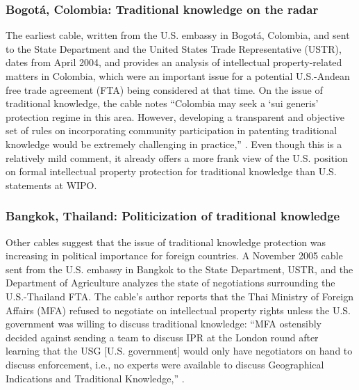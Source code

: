 \documentclass[12pt]{article}
\begin{document}
\subsubsection{Bogot\'a, Colombia: Traditional knowledge on the radar}
The earliest 
cable, written from the U.S. embassy in Bogot\'a, Colombia, and sent to the State Department and the 
United States Trade Representative (USTR), dates from April 2004, and provides an analysis of intellectual 
property-related matters in Colombia, which were an important issue for a potential U.S.-Andean 
free trade agreement (FTA) being considered at that time. 
On the issue of traditional knowledge, the cable 
notes ``Colombia may seek a `sui generis' protection regime in this area. However, developing a 
transparent and objective set of rules on incorporating community participation in patenting 
traditional knowledge would be extremely challenging in 
practice,'' \citep{u.s._department_of_state2004andean}. Even though this 
is a relatively mild comment, it already offers a more frank view of the U.S. position on formal 
intellectual property protection for traditional knowledge than U.S. statements at WIPO.

\subsubsection{Bangkok, Thailand: Politicization of traditional knowledge}
Other cables suggest that the issue of traditional knowledge protection was increasing in political 
importance for foreign countries. A November 2005 cable sent from the U.S. embassy in Bangkok to the 
State Department, 
USTR, and the Department of Agriculture analyzes the state of negotiations surrounding the 
U.S.-Thailand FTA.
The cable's author reports that the Thai Ministry of Foreign Affairs (MFA) refused to negotiate on  
intellectual property rights unless the U.S. government was willing to discuss traditional knowledge: 
``MFA ostensibly decided against sending a team to discuss IPR at the London round after learning that 
the USG [U.S. government] would only have negotiators on hand to discuss enforcement, i.e., no experts were available to 
discuss Geographical Indications and Traditional 
Knowledge,'' \citep{u.s._department_of_state2005u.s.-thailand}.
\end{document}
